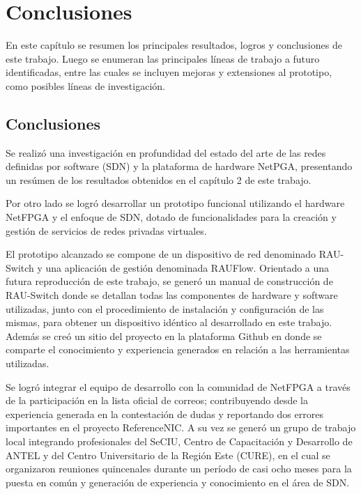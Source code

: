 \chapter{Conclusiones}

\ifpdf
    \graphicspath{{Chapter8/Figs/Raster/}{Chapter8/Figs/PDF/}{Chapter8/Figs/}}
\else
    \graphicspath{{Chapter8/Figs/Vector/}{Chapter8/Figs/}}
\fi

En este cap\'itulo se resumen los principales resultados, logros y conclusiones de este trabajo. Luego se enumeran las principales l\'ineas de trabajo a futuro identificadas, entre las cuales se incluyen mejoras y extensiones al prototipo, como posibles l\'ineas de investigaci\'on.

\section{Conclusiones}
Se realiz\'o una investigaci\'on en profundidad del estado del arte de las redes definidas por software  
 (SDN) y la plataforma de hardware NetPGA, presentando un res\'umen de los resultados obtenidos en el cap\'itulo 2 de este trabajo.

Por otro lado se logr\'o desarrollar un prototipo funcional utilizando el hardware NetFPGA y el enfoque de SDN, dotado de funcionalidades para la creaci\'on y gesti\'on de servicios de redes privadas virtuales. 

El prototipo alcanzado se compone de un dispositivo de red denominado RAU-Switch y una aplicaci\'on de gesti\'on denominada RAUFlow. Orientado a una futura reproducci\'on de este trabajo, se gener\'o un manual de construcci\'on de RAU-Switch donde se detallan todas las componentes de hardware y software utilizadas, junto con el procedimiento de instalaci\'on y configuraci\'on de las mismas, para obtener un dispositivo id\'entico al desarrollado en este trabajo. Adem\'as se cre\'o un sitio del proyecto en la plataforma Github en donde se comparte el conocimiento y experiencia generados en relaci\'on a las herramientas utilizadas. 

Se logr\'o integrar el equipo de desarrollo con la comunidad de NetFPGA a trav\'es de la participaci\'on en la lista oficial de correos; contribuyendo desde la experiencia generada en la contestaci\'on de dudas y reportando dos errores importantes en el proyecto ReferenceNIC. A su vez se gener\'o un grupo de trabajo local integrando profesionales del SeCIU, Centro de Capacitaci\'on y Desarrollo de ANTEL y del Centro Universitario de la Regi\'on Este (CURE), en el cual se organizaron reuniones quincenales durante un per\'iodo de casi ocho meses para la puesta en com\'un y generaci\'on de experiencia y conocimiento en el \'area de SDN.

